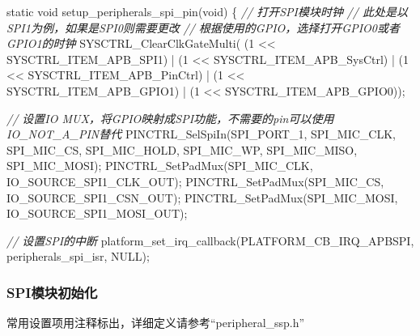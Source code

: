 \documentclass[
  12pt,
]{book}
\newenvironment{Shaded}{\begin{snugshade}}{\end{snugshade}}
\newcommand{\CommentTok}[1]{\textcolor[rgb]{0.56,0.35,0.01}{\textit{#1}}}
\newcommand{\DataTypeTok}[1]{\textcolor[rgb]{0.13,0.29,0.53}{#1}}
\newcommand{\DecValTok}[1]{\textcolor[rgb]{0.00,0.00,0.81}{#1}}
\newcommand{\NormalTok}[1]{#1}
\begin{document}
\begin{Shaded}
\begin{Highlighting}[]
\DataTypeTok{static} \DataTypeTok{void}\NormalTok{ setup_peripherals_spi_pin(}\DataTypeTok{void}\NormalTok{)}
\NormalTok{\{}
    \CommentTok{// 打开SPI模块时钟}
    \CommentTok{// 此处是以SPI1为例，如果是SPI0则需要更改}
    \CommentTok{// 根据使用的GPIO，选择打开GPIO0或者GPIO1的时钟}
\NormalTok{    SYSCTRL_ClearClkGateMulti(    (}\DecValTok{1}\NormalTok{ << SYSCTRL_ITEM_APB_SPI1)}
\NormalTok{                                | (}\DecValTok{1}\NormalTok{ << SYSCTRL_ITEM_APB_SysCtrl)}
\NormalTok{                                | (}\DecValTok{1}\NormalTok{ << SYSCTRL_ITEM_APB_PinCtrl)}
\NormalTok{                                | (}\DecValTok{1}\NormalTok{ << SYSCTRL_ITEM_APB_GPIO1)}
\NormalTok{                                | (}\DecValTok{1}\NormalTok{ << SYSCTRL_ITEM_APB_GPIO0));}

    \CommentTok{// 设置IO MUX，将GPIO映射成SPI功能，不需要的pin可以使用IO_NOT_A_PIN替代}
\NormalTok{    PINCTRL_SelSpiIn(SPI_PORT_1, SPI_MIC_CLK, SPI_MIC_CS, SPI_MIC_HOLD, SPI_MIC_WP, SPI_MIC_MISO, SPI_MIC_MOSI);}
\NormalTok{    PINCTRL_SetPadMux(SPI_MIC_CLK, IO_SOURCE_SPI1_CLK_OUT);}
\NormalTok{    PINCTRL_SetPadMux(SPI_MIC_CS, IO_SOURCE_SPI1_CSN_OUT);}
\NormalTok{    PINCTRL_SetPadMux(SPI_MIC_MOSI, IO_SOURCE_SPI1_MOSI_OUT);}
    
    \CommentTok{// 设置SPI的中断}
\NormalTok{    platform_set_irq_callback(PLATFORM_CB_IRQ_APBSPI, peripherals_spi_isr, NULL);}
\end{Highlighting}
\end{Shaded}

\hypertarget{spiux6a21ux5757ux521dux59cbux5316-6}{%
\subsubsection{SPI模块初始化}\label{spiux6a21ux5757ux521dux59cbux5316-6}}

常用设置项用注释标出，详细定义请参考``peripheral\_ssp.h''
\end{document}
